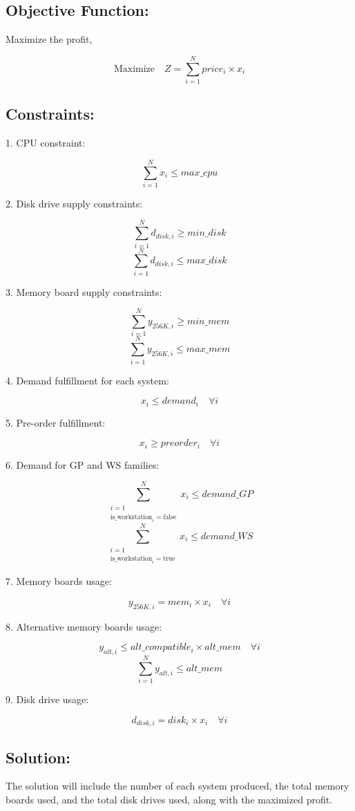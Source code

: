 \documentclass{article}
\begin{document}
\subsection*{Objective Function:}

Maximize the profit,

\[
\text{Maximize} \quad Z = \sum_{i=1}^{N} price_i \times x_i
\]

\subsection*{Constraints:}

1. CPU constraint:

\[
\sum_{i=1}^{N} x_i \leq max\_cpu
\]

2. Disk drive supply constraints:

\[
\sum_{i=1}^{N} d_{disk,i} \geq min\_disk
\]
\[
\sum_{i=1}^{N} d_{disk,i} \leq max\_disk
\]

3. Memory board supply constraints:

\[
\sum_{i=1}^{N} y_{256K,i} \geq min\_mem
\]
\[
\sum_{i=1}^{N} y_{256K,i} \leq max\_mem
\]

4. Demand fulfillment for each system:

\[
x_i \leq demand_i \quad \forall i
\]

5. Pre-order fulfillment:

\[
x_i \geq preorder_i \quad \forall i
\]

6. Demand for GP and WS families:

\[
\sum_{\substack{i=1 \\ \text{is\_workstation}_i = \text{false}}}^{N} x_i \leq demand\_GP
\]
\[
\sum_{\substack{i=1 \\ \text{is\_workstation}_i = \text{true}}}^{N} x_i \leq demand\_WS
\]

7. Memory boards usage:

\[
y_{256K,i} = mem_i \times x_i \quad \forall i
\]

8. Alternative memory boards usage:

\[
y_{alt,i} \leq alt\_compatible_i \times alt\_mem \quad \forall i
\]
\[
\sum_{i=1}^{N} y_{alt,i} \leq alt\_mem
\]

9. Disk drive usage:

\[
d_{disk,i} = disk_i \times x_i \quad \forall i
\]

\subsection*{Solution:}

The solution will include the number of each system produced, the total memory boards used, and the total disk drives used, along with the maximized profit.
\end{document}
